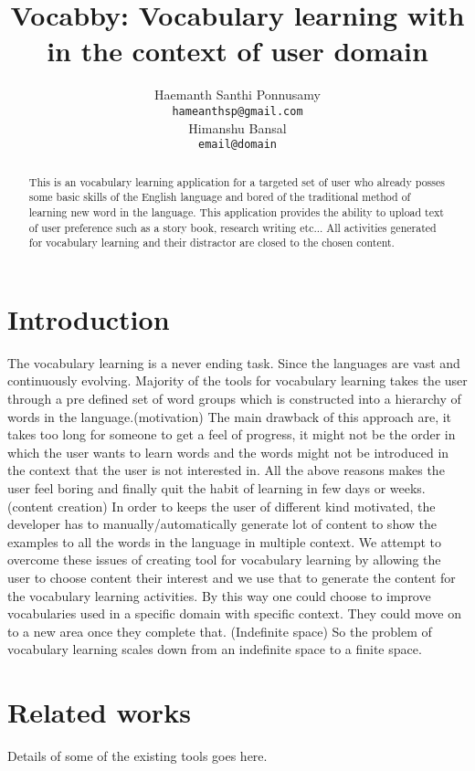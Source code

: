 \documentclass[11pt,a4paper]{article}
\title{Vocabby: Vocabulary learning with in the context of user domain}
\author{Haemanth Santhi Ponnusamy \\
  {\tt hameanthsp@gmail.com} \\\And
  Himanshu Bansal \\
  {\tt email@domain}}
\date{}
\begin{document}
\maketitle
\begin{abstract}
  This is an vocabulary learning application for a targeted set of user
  who already posses some basic skills of the English language and
  bored of the traditional method of learning new word in the language. This
  application provides the ability to upload text of user preference
  such as a story book, research writing etc... All activities generated for
  vocabulary learning and their distractor are closed to the chosen content.
\end{abstract}

\section{Introduction}
The vocabulary learning is a never ending task. Since the languages are vast
and continuously evolving. Majority of the tools for vocabulary learning takes
the user through a pre defined set of word groups which is constructed into a
hierarchy of words in the language.(motivation) The main drawback of this approach are, it
takes too long for someone to get a feel of progress, it might not be the
order in which the user wants to learn words and the words might not be
introduced in the context that the user is not interested in. All the above reasons
makes the user feel boring and finally quit the habit of learning in few days
or weeks. (content creation) In order to keeps the user of different kind
motivated, the developer has to manually/automatically generate lot of content
to show the examples to all the words in the language in multiple context.
We attempt to overcome these issues of creating tool for vocabulary learning
by allowing the user to choose content their interest and we use that to
generate the content for the vocabulary learning activities. By this way one
could choose to improve vocabularies used in a specific domain with specific
context. They could move on to a new area once they complete that.
(Indefinite space) So the problem of vocabulary learning scales down from an
indefinite space to a finite space.

\section{Related works}
Details of some of the existing tools goes here.
\end{document}

